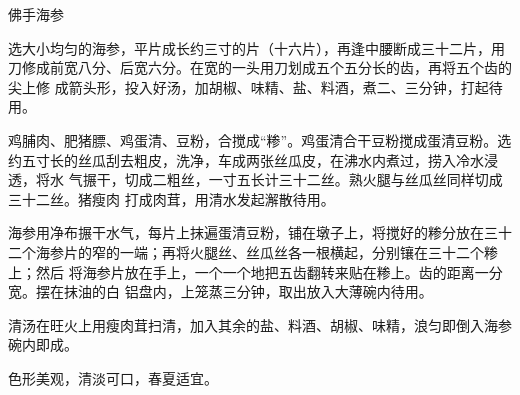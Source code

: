 \begin{recipe}{佛手海参}

\ingredients


\preparation

\step 选大小均匀的海参，平片成长约三寸的片（十六片），再逢中腰断成三十二片，用
刀修成前宽八分、后宽六分。在宽的一头用刀划成五个五分长的齿，再将五个齿的尖上修
成箭头形，投入好汤，加胡椒、味精、盐、料酒，煮二、三分钟，打起待用。

\step 鸡脯肉、肥猪膘、鸡蛋清、豆粉，合搅成“糁”。鸡蛋清合干豆粉搅成蛋清豆粉。选
约五寸长的丝瓜刮去粗皮，洗净，车成两张丝瓜皮，在沸水内煮过，捞入冷水浸透，将水
气搌干，切成二粗丝，一寸五长计三十二丝。熟火腿与丝瓜丝同样切成三十二丝。猪瘦肉
打成肉茸，用清水发起澥散待用。

\step 海参用净布搌干水气，每片上抹遍蛋清豆粉，铺在墩子上，将搅好的糁分放在三十
二个海参片的窄的一端；再将火腿丝、丝瓜丝各一根横起，分别镶在三十二个糁上；然后
将海参片放在手上，一个一个地把五齿翻转来贴在糁上。齿的距离一分宽。摆在抹油的白
铝盘内，上笼蒸三分钟，取出放入大薄碗内待用。

\step 清汤在旺火上用瘦肉茸扫清，加入其余的盐、料酒、胡椒、味精，浪匀即倒入海参
碗内即成。

\features

色形美观，清淡可口，春夏适宜。

\end{recipe}

